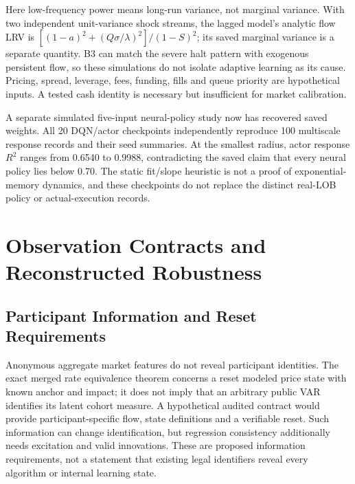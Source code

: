 \documentclass[12pt]{article}
\theoremstyle{definition}
\theoremstyle{remark}
\begin{document}
Here low-frequency power means long-run variance, not marginal variance. With two independent unit-variance shock streams, the lagged model's analytic flow LRV is $[(1-a)^2+(Q\sigma/\lambda)^2]/(1-S)^2$; its saved marginal variance is a separate quantity. B3 can match the severe halt pattern with exogenous persistent flow, so these simulations do not isolate adaptive learning as its cause. Pricing, spread, leverage, fees, funding, fills and queue priority are hypothetical inputs. A tested cash identity is necessary but insufficient for market calibration.

A separate simulated five-input neural-policy study now has recovered saved weights. All 20 DQN/actor checkpoints independently reproduce 100 multiscale response records and their seed summaries. At the smallest radius, actor response $R^2$ ranges from 0.6540 to 0.9988, contradicting the saved claim that every neural policy lies below 0.70. The static fit/slope heuristic is not a proof of exponential-memory dynamics, and these checkpoints do not replace the distinct real-LOB policy or actual-execution records.

\section{Observation Contracts and Reconstructed Robustness}
\label{sec:surveillance}
\subsection{Participant Information and Reset Requirements}
Anonymous aggregate market features do not reveal participant identities. The exact merged rate equivalence theorem concerns a reset modeled price state with known anchor and impact; it does not imply that an arbitrary public VAR identifies its latent cohort measure. A hypothetical audited contract would provide participant-specific flow, state definitions and a verifiable reset. Such information can change identification, but regression consistency additionally needs excitation and valid innovations. These are proposed information requirements, not a statement that existing legal identifiers reveal every algorithm or internal learning state.
\end{document}
